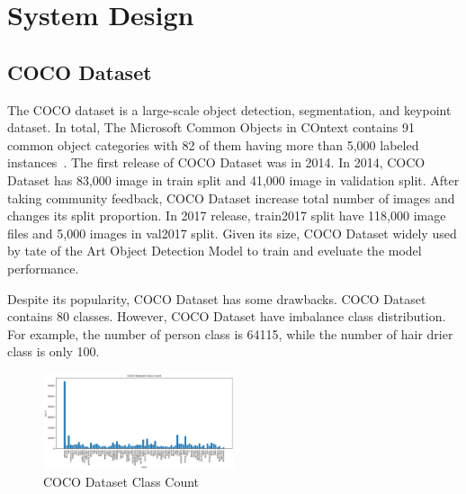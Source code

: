 \documentclass[conference]{IEEEtran}
\begin{document}
\section{System Design}

\subsection{COCO Dataset}\label{AA}
The COCO dataset is a large-scale object detection, segmentation, and keypoint dataset.
In total, The Microsoft Common Objects in COntext contains 91 common object categories with 82 of them having more than 5,000 labeled instances~\cite{COCO Dataset}.
The first release of COCO Dataset was in 2014. In 2014, COCO Dataset has 83,000 image in train split and 41,000 image in validation split.
After taking community feedback, COCO Dataset increase total number of images and changes its split proportion. In 2017 release, train2017 split have 118,000 image files and 5,000 images in val2017 split.
Given its size, COCO Dataset widely used by tate of the Art Object Detection Model to train and eveluate the model performance.

Despite its popularity, COCO Dataset has some drawbacks. COCO Dataset contains 80 classes. However, COCO Dataset have imbalance class distribution.
For example, the number of person class is 64115, while the number of hair drier class is only 100.
\begin{figure}[h]
\centering
\includegraphics[width=0.5\textwidth,keepaspectratio]{coco_class_count.png}
\caption{COCO Dataset Class Count}
\end{figure}
\end{document}
